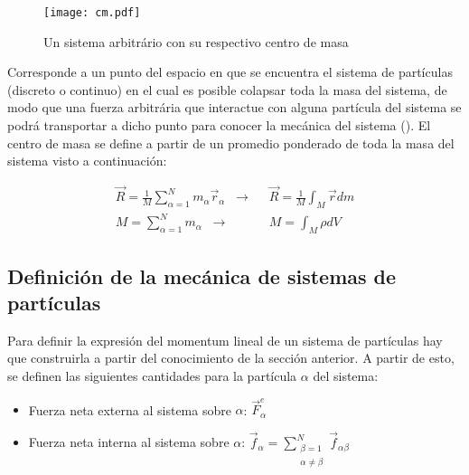 \documentclass[/home/hernan-barquero/Documents/Apuntes_mecanica_teorica/main.tex]{subfiles}
\begin{document}
    \begin{marginfigure}
        \begin{figure}[H]
            \centering
            \texttt{[image: cm.pdf]}
            \caption{Un sistema arbitrário con su respectivo centro de masa}
            \label{fig: centrodemasa}
        \end{figure}
    \end{marginfigure}

    \begin{definition}
        Corresponde a un punto del espacio en que se encuentra el sistema de partículas (discreto o continuo) en el cual es posible colapsar toda la masa del sistema, de modo que una fuerza arbitrária que interactue con alguna partícula del sistema se podrá transportar a dicho punto para conocer la mecánica del sistema (). El centro de masa se define a partir de un promedio ponderado de toda la masa del sistema visto a continuación:

        \begin{align}
            \vec{R} = \frac{1}{M} \sum_{\alpha =1}^{N} m_{\alpha} \vec{r}_{\alpha} \; \; \rightarrow  & \; \; \vec{R} = \frac{1}{M} \int_{M} \vec{r} dm \\ 
            M = \sum_{\alpha = 1}^{N} m_{\alpha} \; \; \rightarrow  & \; \; M =  \int_{M}  \rho dV
        \end{align}
        
    \end{definition}

	\subsection{Definición de la mecánica de sistemas de partículas}

	Para definir la expresión del momentum lineal de un sistema de partículas hay que construirla a partir del conocimiento de la sección anterior. A partir de esto, se definen las siguientes cantidades para la partícula $\alpha$ del sistema:

	\begin{itemize}
		\item Fuerza neta externa al sistema sobre $\alpha$: $\vec{F}_{\alpha}^{e}$ 
		\item Fuerza neta interna al sistema sobre $\alpha$: $\vec{f}_{\alpha}= \sum_{\left .\begin{matrix} \beta = 1\\ \alpha \neq \beta \end{matrix}\right .}^{N}\vec{f}_{\alpha \beta}$ 
	\end{itemize}
\end{document}
